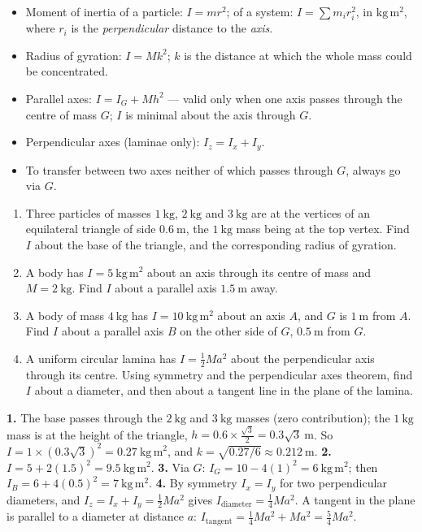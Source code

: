 \documentclass[11pt]{article}
\begin{document}
\begin{aretenir}
\begin{itemize}
\item Moment of inertia of a particle: $I = mr^2$; of a system: $I = \sum m_i r_i^2$, in $\mathrm{kg\,m^2}$, where $r_i$ is the \emph{perpendicular} distance to the \emph{axis}.
\item Radius of gyration: $I = Mk^2$; $k$ is the distance at which the whole mass could be concentrated.
\item Parallel axes: $I = I_G + Mh^2$ --- valid only when one axis passes through the centre of mass $G$; $I$ is minimal about the axis through $G$.
\item Perpendicular axes (laminae only): $I_z = I_x + I_y$.
\item To transfer between two axes neither of which passes through $G$, always go via $G$.
\end{itemize}
\end{aretenir}

\begin{exercice}[Practice]
\begin{enumerate}
\item Three particles of masses $1\ \mathrm{kg}$, $2\ \mathrm{kg}$ and $3\ \mathrm{kg}$ are at the vertices of an equilateral triangle of side $0.6\ \mathrm{m}$, the $1\ \mathrm{kg}$ mass being at the top vertex. Find $I$ about the base of the triangle, and the corresponding radius of gyration.
\item A body has $I = 5\ \mathrm{kg\,m^2}$ about an axis through its centre of mass and $M = 2\ \mathrm{kg}$. Find $I$ about a parallel axis $1.5\ \mathrm{m}$ away.
\item A body of mass $4\ \mathrm{kg}$ has $I = 10\ \mathrm{kg\,m^2}$ about an axis $A$, and $G$ is $1\ \mathrm{m}$ from $A$. Find $I$ about a parallel axis $B$ on the other side of $G$, $0.5\ \mathrm{m}$ from $G$.
\item A uniform circular lamina has $I = \tfrac{1}{2}Ma^2$ about the perpendicular axis through its centre. Using symmetry and the perpendicular axes theorem, find $I$ about a diameter, and then about a tangent line in the plane of the lamina.
\end{enumerate}
\end{exercice}

\begin{corrige}[Exercise 1]
\textbf{1.} The base passes through the $2\ \mathrm{kg}$ and $3\ \mathrm{kg}$ masses (zero contribution); the $1\ \mathrm{kg}$ mass is at the height of the triangle, $h = 0.6\times\frac{\sqrt{3}}{2} = 0.3\sqrt{3}\ \mathrm{m}$. So $I = 1\times(0.3\sqrt{3})^2 = 0.27\ \mathrm{kg\,m^2}$, and $k = \sqrt{0.27/6} \approx 0.212\ \mathrm{m}$.
\textbf{2.} $I = 5 + 2(1.5)^2 = 9.5\ \mathrm{kg\,m^2}$.
\textbf{3.} Via $G$: $I_G = 10 - 4(1)^2 = 6\ \mathrm{kg\,m^2}$; then $I_B = 6 + 4(0.5)^2 = 7\ \mathrm{kg\,m^2}$.
\textbf{4.} By symmetry $I_x = I_y$ for two perpendicular diameters, and $I_z = I_x + I_y = \tfrac{1}{2}Ma^2$ gives $I_{\text{diameter}} = \tfrac{1}{4}Ma^2$. A tangent in the plane is parallel to a diameter at distance $a$: $I_{\text{tangent}} = \tfrac{1}{4}Ma^2 + Ma^2 = \tfrac{5}{4}Ma^2$.
\end{corrige}
\end{document}
